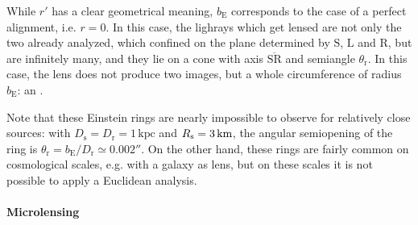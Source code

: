While $ r' $ has a clear geometrical meaning, $ b_\text{E} $ corresponds to the case of a perfect alignment, i.e. $ r = 0 $. In this case, the lighrays which get lensed are not only the two already analyzed, which confined on the plane determined by $ \text{S} $, $ \text{L} $ and $ \text{R} $, but are infinitely many, and they lie on a cone with axis $ \overline{\text{SR}} $ and semiangle $ \theta_\text{r} $. In this case, the lens does not produce two images, but a whole circumference of radius $ b_\text{E} $: an .

Note that these Einstein rings are nearly impossible to observe for relatively close sources: with $ D_\text{s} = D_\text{r} = 1 \,\text{kpc} $ and $ R_\text{s} = 3 \,\text{km} $, the angular semiopening of the ring is $ \theta_\text{r} = b_\text{E} / D_\text{r} \simeq 0.002'' $. On the other hand, these rings are fairly common on cosmological scales, e.g. with a galaxy as lens, but on these scales it is not possible to apply a Euclidean analysis.

\paragraph{Microlensing}

